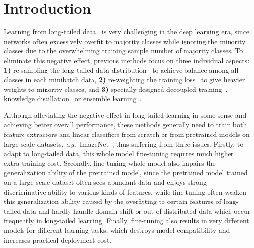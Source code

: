 \documentclass{article} \usepackage{iclr2023_conference,times}
\newcommand{\eg}{\emph{e.g.}}
\begin{document}
\section{Introduction}\label{sec:intro}
\vspace{-0.7em}
Learning from  long-tailed data~\citep{cui2019cbloss,Kang2020Decoupling,zhang2021deep} is very challenging in the deep learning era, since networks often excessively overfit to majority classes while ignoring the minority classes  due to the  overwhelming training sample number of majority classes. To eliminate this negative effect, previous methods focus on three individual aspects: \textbf{1)} re-sampling the long-tailed data distribution~\citep{Kang2020Decoupling,Li2022Long,li2021metasaug,ren2020metasoftmax} to achieve balance among all classes in each minibatch data, \textbf{2)} re-weighting the training loss~\citep{cui2019cbloss,Li2022Long,menon2021longtail} to give heavier weights to minority classes, and \textbf{3)} specially-designed decoupled training~\citep{Kang2020Decoupling}, knowledge distillation~\citep{li2021self} or ensemble learning~\citep{zhou2020bbn,wang2020long}. 



Although alleviating the negative effect in long-tailed learning in some sense and achieving  better overall    performance, these methods generally need to train both feature extractors and linear classifiers from scratch or from  pretrained models on  large-scale datasets, \eg~ImageNet~\citep{deng2009imagenet}, thus suffering from three  issues. Firstly,  to  adapt  to long-tailed data,  this whole model fine-tuning  requires much higher extra training cost. Secondly, fine-tuning whole model also impairs the generalization ability of the pretrained model, since the  pretrained model trained on a large-scale dataset often sees abundant data and enjoys  strong discriminative ability to various kinds of features, while  fine-tuning often weaken  this generalization ability caused by the overfitting to certain features of long-tailed data and hardly handle domain-shift or out-of-distributed data which occur frequently in long-tailed learning.   Finally, fine-tuning also results in  very  different models for different learning tasks, which  destroys model compatibility and increases  practical deployment cost.
\end{document}
